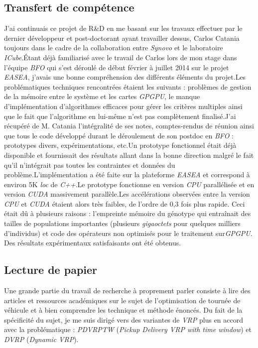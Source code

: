 \documentclass[french, 11pt]{memoir}
\begin{document}
\subsection{Transfert de compétence}\label{transfert-de-compuxe9tence}

J'ai continuais ce projet de R\&D en me basant sur les travaux effectuer
par le dernier développeur et post-doctorant ayant travailler dessus,
Carlos Catania toujours dans le cadre de la collaboration entre
\emph{Synovo} et le laboratoire \emph{ICube}.Étant déjà familiarisé avec
le travail de Carlos lors de mon stage dans l'équipe \emph{BFO} qui
s'est déroulé de début février à juillet 2014 sur le projet
\emph{EASEA}, j'avais une bonne compréhension des différents éléments du
projet.Les problématiques techniques rencontrées étaient les suivants :
problèmes de gestion de la mémoire entre le système et les cartes
\emph{GPGPU}, le manque d'implémentation d'algorithmes efficaces pour
gérer les critères multiples ainsi que le fait que l'algorithme en
lui-même n'est pas complètement finalisé.J'ai récupéré de M. Catania
l'intégralité de ses notes, comptes-rendus de réunion ainsi que tous le
code développé durant le déroulement de son postdoc en \textit{BFO} :
prototypes divers, expérimentations, etc.Un prototype fonctionnel était
déjà disponible et fournissait des résultats allant dans la bonne
direction malgré le fait qu'il n'intégrait pas toutes les contraintes et
données du problème.L'implémentation a été faite sur la plateforme
\emph{EASEA} et correspond à environ 5K \emph{loc} de \emph{C++}.Le
prototype fonctionne en version \emph{CPU} parallélisée et en version
\emph{CUDA} massivement parallèle.Les accélérations observées entre la
version \emph{CPU} et \emph{CUDA} étaient alors très faibles, de l'ordre
de 0,3 fois plus rapide. Ceci était dû à plusieurs raisons : l'empreinte
mémoire du génotype qui entraînait des tailles de populations
importantes (plusieurs \emph{gigaoctets} pour quelques milliers
d'individus) et code des opérateurs non optimisés pour le traitement
sur\textit{GPGPU}. Des résultats expérimentaux satisfaisants ont été obtenus.

\subsection{Lecture de papier}\label{lecture-de-papier}

Une grande partie du travail de recherche à proprement parler consiste à
lire des articles et ressources académiques sur le sujet de
l'optimisation de tournée de véhicule et à bien comprendre les technique
et méthode énoncés. Du fait de la spécificité du sujet, je me suis
dirigé vers des variantes de \textit{VRP} plus en accord avec la problématique
: \emph{PDVRPTW} (\emph{Pickup Delivery VRP with time window}) et
\emph{DVRP} (\emph{Dynamic VRP}).
\end{document}
